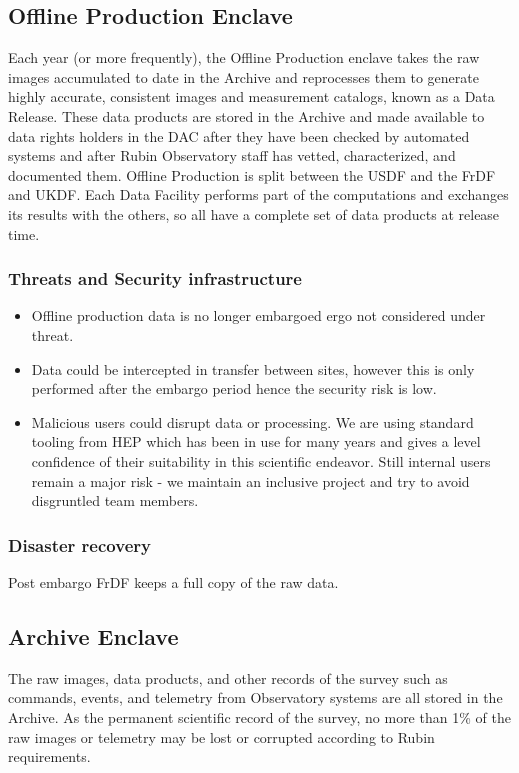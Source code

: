 \subsection{ Offline Production  \gls{Enclave}}
Each year (or more frequently), the Offline Production enclave takes the raw images accumulated to date in the Archive and reprocesses them to generate highly accurate, consistent images and measurement catalogs, known as a Data Release. These data products are stored in the Archive and made available to data rights holders in the DAC after they have been checked by automated systems and after Rubin Observatory staff has vetted, characterized, and documented them. Offline Production is split between the USDF and the \gls{FrDF} and UKDF. Each Data Facility performs part of the computations and exchanges its results with the others, so all have a complete set of data products at release time.


\subsubsection{ Threats and Security infrastructure}
\begin{itemize}
\item Offline production data is no longer embargoed ergo not considered under threat.
\item Data could be intercepted in transfer between sites, however this is only performed after the embargo period hence the security risk is low.
\item Malicious users could disrupt data or processing.
We are using standard tooling from \gls{HEP} which has been in use for many years and gives a level confidence of their suitability in this scientific endeavor.
Still internal users remain a major risk - we maintain an inclusive project and try to avoid disgruntled team members.
\end{itemize}
\subsubsection{Disaster recovery}
Post embargo FrDF keeps a full copy of the raw data.

\subsection{ \gls{Archive}  Enclave}
The raw images, data products, and other records of the survey such as commands, events, and telemetry from Observatory systems are all stored in the \gls{Archive}.
As the permanent scientific record of the survey, no more than 1\% of the raw images or telemetry may be lost or corrupted according to Rubin requirements.

